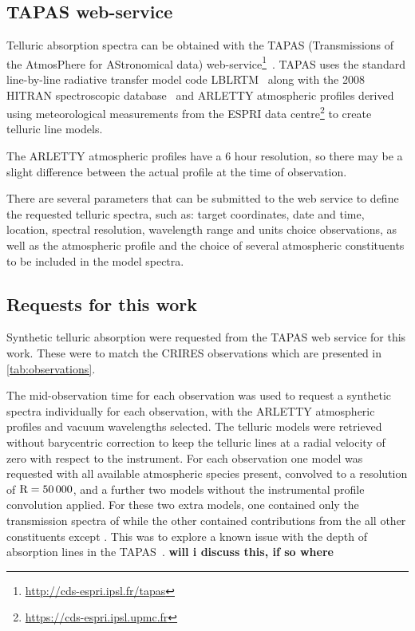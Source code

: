 

\subsection{TAPAS web-service}
\label{subsubsec:TAPAS}

Telluric absorption spectra can be obtained with the {TAPAS} (Transmissions of the AtmosPhere for AStronomical data) web-service\footnote{\href{http://cds-espri.ipsl.fr/tapas}{http://cds-espri.ipsl.fr/tapas}}~\citep{bertaux_tapas_2014}.
{TAPAS} uses the standard line-by-line radiative transfer model code LBLRTM~\citep{clough_linebyline_1995} along with the 2008 {HITRAN} spectroscopic database~\citep{rothman_hitran_2009} and {ARLETTY} atmospheric profiles derived using meteorological measurements from the ESPRI data centre\footnote{\href{https://cds-espri.ipsl.upmc.fr}{https://cds-espri.ipsl.upmc.fr}} to create telluric line models.

The {ARLETTY} atmospheric profiles have a 6 hour resolution, so there may be a slight difference between the actual profile at the time of observation.

There are several parameters that can be submitted to the web service to define the requested telluric spectra, such as: target coordinates, date and time, location, spectral resolution, wavelength range and units choice observations, as well as the atmospheric profile and the choice of several atmospheric constituents to be included in the model spectra.


\subsection{Requests for this work}
Synthetic telluric absorption were requested from the TAPAS web service for this work.
These were to match the CRIRES observations which are presented in \cref{tab:observations}.
 
The mid-observation time for each observation was used to request a synthetic spectra individually for each observation, with the {ARLETTY} atmospheric profiles and vacuum wavelengths selected.
The telluric models were retrieved without barycentric correction to keep the telluric lines at a radial velocity of zero with respect to the instrument.
For each observation one model was requested with all available atmospheric species present, convolved to a resolution of \(\rm R=50\,000\), and a further two models without the instrumental profile convolution applied.
For these two extra models, one contained only the transmission spectra of  while the other contained contributions from the all other constituents except .
This was to explore a known issue with the depth of  absorption lines in the {TAPAS}~\citet{bertaux_tapas_2014}.
\textbf{will i discuss this, if so where}


